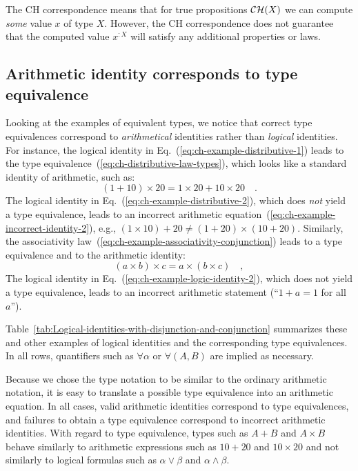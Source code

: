 The CH correspondence means that for true propositions ${\cal CH}(X)$
we can compute \emph{some} value $x$ of type $X$. However, the CH
correspondence does not guarantee that the computed value $x^{:X}$
will satisfy any additional properties or laws.

\subsection{Arithmetic identity corresponds to type equivalence}

Looking at the examples of equivalent types, we notice that correct
type equivalences correspond to \emph{arithmetical} identities rather
than \emph{logical} identities. For instance, the logical identity
in Eq.~(\ref{eq:ch-example-distributive-1}) leads to the type equivalence~(\ref{eq:ch-distributive-law-types}),
which looks like a standard identity of arithmetic, such as:
\[
(1+10)\times20=1\times20+10\times20\quad.
\]
The logical identity in Eq.~(\ref{eq:ch-example-distributive-2}),
which does \emph{not} yield a type equivalence, leads to an incorrect
arithmetic equation~(\ref{eq:ch-example-incorrect-identity-2}),
e.g., $\left(1\times10\right)+20\neq\left(1+20\right)\times\left(10+20\right)$.
Similarly, the associativity law~(\ref{eq:ch-example-associativity-conjunction})
leads to a type equivalence and to the arithmetic identity:
\[
\left(a\times b\right)\times c=a\times\left(b\times c\right)\quad,
\]
The logical identity in Eq.~(\ref{eq:ch-example-logic-identity-2}),
which does not yield a type equivalence, leads to an incorrect arithmetic
statement (\textsf{``}$1+a=1$ for all $a$\textsf{''}).

Table~\ref{tab:Logical-identities-with-disjunction-and-conjunction}
summarizes these and other examples of logical identities and the
corresponding type equivalences. In all rows, quantifiers such as
$\forall\alpha$ or $\forall(A,B)$ are implied as necessary.

Because we chose the type notation to be similar to the ordinary arithmetic
notation, it is easy to translate a possible type equivalence into
an arithmetic equation. In all cases, valid arithmetic identities
correspond to type equivalences, and failures to obtain a type equivalence
correspond to incorrect arithmetic identities. With regard to type
equivalence, types such as $A+B$ and $A\times B$ behave similarly
to arithmetic expressions such as $10+20$ and $10\times20$ and not
similarly to logical formulas such as $\alpha\vee\beta$ and $\alpha\wedge\beta$.

